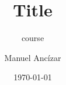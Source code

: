 \documentclass[
    xcolor={dvipsnames},
    hyperref={colorlinks=false}
]{beamer}
\title{Title}
\subtitle{course}
\author{Manuel Ancízar}
\institute[UNal]{Facultad de Ciencias\\Universidad Nacional de Colombia}
\date{\today}
\begin{document}
\frame{\titlepage}



\end{document}
